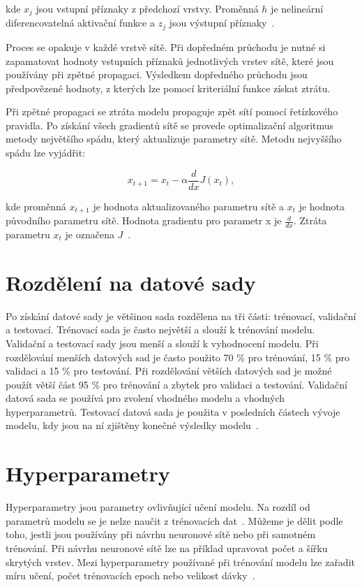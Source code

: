 \documentclass[FM,BP]{tulthesis}
\begin{document}
kde $ x_j $ jsou vstupní příznaky z předchozí vrstvy. Proměnná $ h $ je nelineární diferencovatelná aktivační funkce a $ z_j $ jsou výstupní příznaky~\cite{DBLP:books/lib/Bishop07}.

Proces se opakuje v každé vrstvě sítě. Při dopředném průchodu je nutné si zapamatovat hodnoty vstupních příznaků jednotlivých vrstev sítě, které jsou používány při zpětné propagaci. Výsledkem dopředného průchodu jsou předpovězené hodnoty, z kterých lze pomocí kriteriální funkce získat ztrátu.

Při zpětné propagaci se ztráta modelu propaguje zpět sítí pomocí řetízkového pravidla. Po získání všech gradientů sítě se provede optimalizační algoritmus metody největšího spádu, který aktualizuje parametry sítě. Metodu nejvyššího spádu lze vyjádřit:

\begin{equation}
\label{eqn:gradient_descent}
x_{t+1} = x_t - \alpha \frac{d}{dx}J(x_t),
\end{equation}

kde proměnná $ x_{t+1} $ je hodnota aktualizovaného parametru sítě a $ x_t $ je hodnota původního parametru sítě. Hodnota gradientu pro parametr x je $ \frac{d}{dx} $. Ztráta parametru $ x_t $ je označena $ J $~\cite{DBLP:books/lib/Bishop07}.

\section{Rozdělení na datové sady} %
Po získání datové sady je většinou sada rozdělena na tři části: trénovací, validační a testovací. Trénovací sada je často největší a slouží k trénování modelu. Validační a testovací sady jsou menší a slouží k vyhodnocení modelu.
Při rozdělování menších datových sad je často použito 70 \% pro trénování, 15 \% pro validaci a 15 \% pro testování. Při rozdělování větších datových sad je možné použít větší část 95 \% pro trénování a zbytek pro validaci a testování. Validační datová sada se používá pro zvolení vhodného modelu a vhodných hyperparametrů. Testovací datová sada je použita v posledních částech vývoje modelu, kdy jsou na ní zjištěny konečné výsledky modelu~\cite{burkov2019hundred}.

\section{Hyperparametry} %
Hyperparametry jsou parametry ovlivňující učení modelu. Na rozdíl od parametrů modelu se je nelze naučit z trénovacích dat~\cite{geron2019hands}. Můžeme je dělit podle toho, jestli jsou používány při návrhu neuronové sítě nebo při samotném trénování. Při návrhu neuronové sítě lze na příklad upravovat počet a šířku skrytých vrstev. Mezi hyperparametry používané při trénování modelu lze zařadit míru učení, počet trénovacích epoch nebo velikost dávky~\cite{dagli_2021}.
\end{document}
